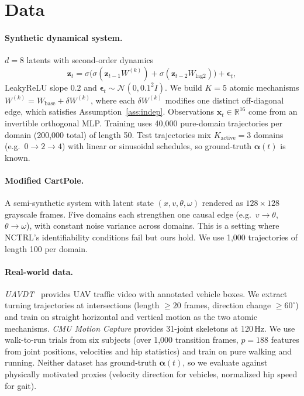 \documentclass[sigconf,nonacm]{acmart}
\theoremstyle{plain}
\theoremstyle{definition}
\newcommand{\va}{\boldsymbol{\alpha}}
\newcommand{\vz}{\mathbf{z}}
\newcommand{\vx}{\mathbf{x}}
\begin{document}
\section{Data}

\paragraph{Synthetic dynamical system.}
$d=8$ latents with second-order dynamics
\begin{equation*}
\vz_t=\sigma\big(\sigma(\vz_{t-1}W^{(k)})+\sigma(\vz_{t-2}W_{\text{lag2}})\big)+\boldsymbol\epsilon_t,
\end{equation*}
LeakyReLU slope $0.2$ and $\boldsymbol\epsilon_t\sim\mathcal{N}(0,0.1^2I)$. We build $K=5$ atomic mechanisms $W^{(k)}=W_{\text{base}}+\delta W^{(k)}$, where each $\delta W^{(k)}$ modifies one distinct off-diagonal edge, which satisfies Assumption~\ref{ass:indep}. Observations $\vx_t\in\mathbb{R}^{16}$ come from an invertible orthogonal MLP. Training uses 40,000 pure-domain trajectories per domain (200,000 total) of length 50. Test trajectories mix $K_{\text{active}}=3$ domains (e.g.\ $0\to2\to4$) with linear or sinusoidal schedules, so ground-truth $\va(t)$ is known.

\paragraph{Modified CartPole.}
A semi-synthetic system with latent state $(x,v,\theta,\omega)$ rendered as $128\times128$ grayscale frames. Five domains each strengthen one causal edge (e.g.\ $v\to\theta$, $\theta\to\omega$), with constant noise variance across domains. This is a setting where NCTRL's identifiability conditions fail but ours hold. We use 1,000 trajectories of length 100 per domain.

\paragraph{Real-world data.}
\emph{UAVDT}~\citep{Uavdt} provides UAV traffic video with annotated vehicle boxes. We extract turning trajectories at intersections (length $\ge20$ frames, direction change $\ge60^\circ$) and train on straight horizontal and vertical motion as the two atomic mechanisms. \emph{CMU Motion Capture} provides 31-joint skeletons at 120\,Hz. We use walk-to-run trials from six subjects (over 1,000 transition frames, $p=188$ features from joint positions, velocities and hip statistics) and train on pure walking and running. Neither dataset has ground-truth $\va(t)$, so we evaluate against physically motivated proxies (velocity direction for vehicles, normalized hip speed for gait).
\end{document}
